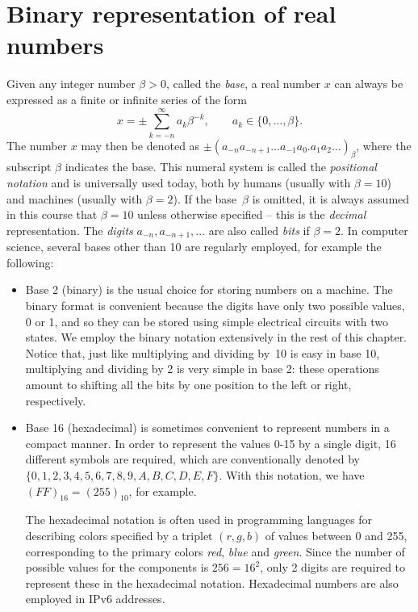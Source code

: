 \section{Binary representation of real numbers}%
\label{sec:binary_representation_of_real_numbers}

Given any integer number $\beta > 0$, called the \emph{base},
a real number $x$ can always be expressed as a finite or infinite series of the form
\begin{equation}
    \label{eq:base_representation}
    x = \pm \sum_{k=-n}^{\infty} a_k \beta^{-k}, \qquad a_k \in \{0, \dotsc, \beta\}.
\end{equation}
The number $x$ may then be denoted as $\pm (a_{-n} a_{-n+1}\dots a_{-1} a_{0}.a_{1} a_{2} \dots)_{\beta}$,
where the subscript $\beta$ indicates the base.
This numeral system is called the \emph{positional notation} and is universally used today,
both by humans (usually with $\beta=10$) and machines (usually with $\beta=2$).
If the base~$\beta$ is omitted,
it is always assumed in this course that $\beta = 10$ unless otherwise specified
-- this is the \emph{decimal} representation.
The \emph{digits} $a_{-n}, a_{-n+1}, \dotsc$ are also called \emph{bits} if $\beta = 2$.
In computer science, several bases other than 10 are regularly employed,
for example the following:
\begin{itemize}
    \item
        Base 2 (binary) is the usual choice for storing numbers on a machine.
        The binary format is convenient because the digits have only two possible values, 0 or 1,
        and so they can be stored using simple electrical circuits with two states.
        We employ the binary notation extensively in the rest of this chapter.
        Notice that, just like multiplying and dividing by~10 is easy in base 10,
        multiplying and dividing by 2 is very simple in base 2:
        these operations amount to shifting all the bits by one position to the left or right,
        respectively.

    \item
        Base 16 (hexadecimal) is sometimes convenient to represent numbers in a compact manner.
        In order to represent the values 0-15 by a single digit,
        16 different symbols are required, which are conventionally denoted by $\{0,1,2,3,4,5,6,7,8,9,A,B,C,D,E,F\}$.
        With this notation, we have $(FF)_{16} = (255)_{10}$, for example.

        The hexadecimal notation is often used in programming languages for describing colors specified by a triplet $(r,g,b)$ of values between 0 and 255,
        corresponding to the primary colors \emph{red}, \emph{blue} and \emph{green}.
        Since the number of possible values for the components is $256 = 16^2$,
        only 2 digits are required to represent these in the hexadecimal notation.
        Hexadecimal numbers are also employed in IPv6 addresses.
\end{itemize}

